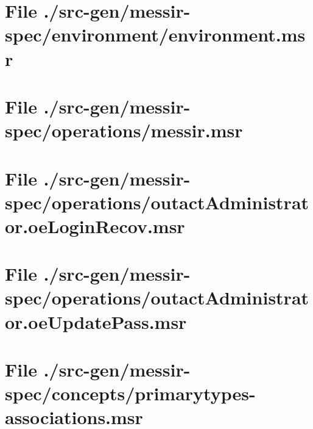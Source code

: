 \section[File /src-gen/messir-spec/environment/environment.msr]{File ./src-gen/messir-spec/environment/environment.msr}
\scriptsize

\normalsize
	
\section[File /src-gen/messir-spec/operations/messir.msr]{File ./src-gen/messir-spec/operations/messir.msr}
\scriptsize

\normalsize
	
\section[File /src-gen/messir-spec/operations/outactAdministrator.oeLoginRecov.msr]{File ./src-gen/messir-spec/operations/outactAdministrator.oeLoginRecov.msr}
\scriptsize

\normalsize
	
\section[File /src-gen/messir-spec/operations/outactAdministrator.oeUpdatePass.msr]{File ./src-gen/messir-spec/operations/outactAdministrator.oeUpdatePass.msr}
\scriptsize

\normalsize
	
\section[File /src-gen/messir-spec/concepts/primarytypes-associations.msr]{File ./src-gen/messir-spec/concepts/primarytypes-associations.msr}
\scriptsize

\normalsize
	
